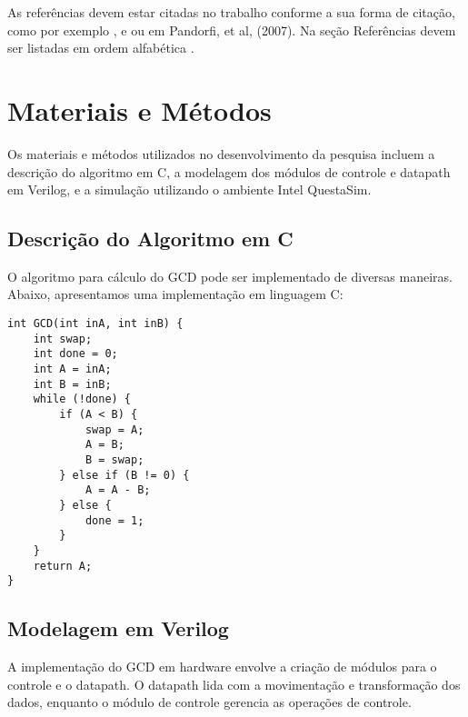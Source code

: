 \documentclass[a4paper,11pt]{article} %
\begin{document}
As referências devem estar citadas no trabalho conforme a sua forma de citação, como por exemplo \cite{alves}, \cite{galvani} e \cite{national_instruments} ou em Pandorfi, et al, (2007). Na seção Referências devem ser listadas em ordem alfabética \cite{pandorfi}.

\section*{Materiais e Métodos}

Os materiais e métodos utilizados no desenvolvimento da pesquisa incluem a descrição do algoritmo em C, a modelagem dos módulos de controle e datapath em Verilog, e a simulação utilizando o ambiente Intel QuestaSim.

\subsection*{Descrição do Algoritmo em C}

O algoritmo para cálculo do GCD pode ser implementado de diversas maneiras. Abaixo, apresentamos uma implementação em linguagem C:

\begin{verbatim}
int GCD(int inA, int inB) {
    int swap;
    int done = 0;
    int A = inA;
    int B = inB;
    while (!done) {
        if (A < B) {
            swap = A;
            A = B;
            B = swap;
        } else if (B != 0) {
            A = A - B;
        } else {
            done = 1;
        }
    }
    return A;
}
\end{verbatim}

\subsection*{Modelagem em Verilog}

A implementação do GCD em hardware envolve a criação de módulos para o controle e o datapath. O datapath lida com a movimentação e transformação dos dados, enquanto o módulo de controle gerencia as operações de controle.
\end{document}
